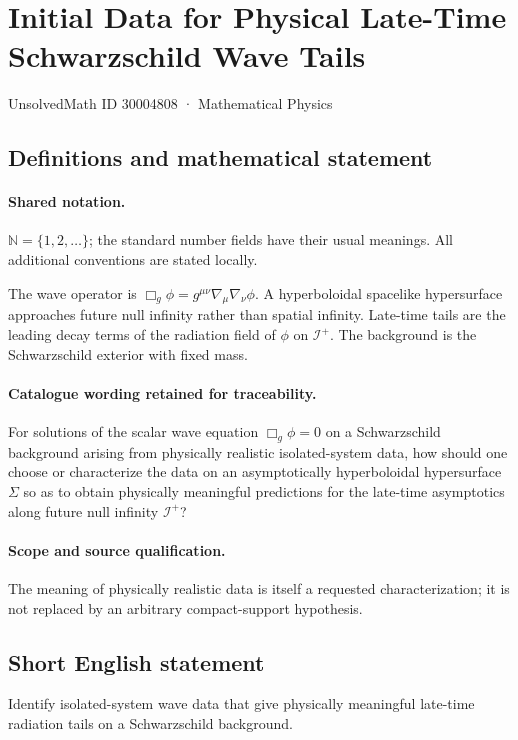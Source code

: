 \documentclass[11pt]{article}
\begin{document}
\setcounter{section}{30004807}
\section{Initial Data for Physical Late-Time Schwarzschild Wave Tails}\label{30004808}
{\small UnsolvedMath ID 30004808 · Mathematical Physics}
\subsection{Definitions and mathematical statement}

\paragraph{Shared notation.}$\mathbb N=\{1,2,\ldots\}$; the standard number fields have their usual meanings. All additional conventions are stated locally.


The wave operator is $\Box_g\phi=g^{\mu\nu}\nabla_\mu\nabla_\nu\phi$. A hyperboloidal spacelike hypersurface approaches future null infinity rather than spatial infinity. Late-time tails are the leading decay terms of the radiation field of $\phi$ on $\mathcal I^+$. The background is the Schwarzschild exterior with fixed mass.

\paragraph{Catalogue wording retained for traceability.}
For solutions of the scalar wave equation $\Box_g\phi=0$ on a Schwarzschild background arising from physically realistic isolated-system data, how should one choose or characterize the data on an asymptotically hyperboloidal hypersurface $\Sigma$ so as to obtain physically meaningful predictions for the late-time asymptotics along future null infinity $\mathcal{I}^+$?

\paragraph{Scope and source qualification.}The meaning of physically realistic data is itself a requested characterization; it is not replaced by an arbitrary compact-support hypothesis.
\subsection{Short English statement}
Identify isolated-system wave data that give physically meaningful late-time radiation tails on a Schwarzschild background.
\end{document}
